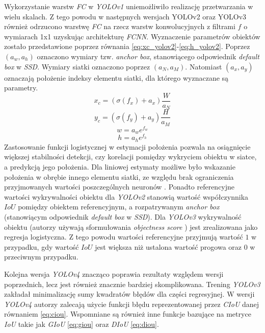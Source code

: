 Wykorzystanie warstw \emph{FC} w  \emph{YOLOv1} uniemożliwiło realizację przetwarzania w wielu skalach.
Z tego powodu w następnych wersjach YOLOv2 \cite{yolov2} oraz YOLOv3 \cite{yolov3} również odrzucono warstwę \emph{FC} na rzecz warstw konwolucyjnych z filtrami $f$ o wymiarach 1x1 uzyskując architekturę \emph{FCNN}. 
Wyznaczenie parametrów obiektów zostało przedstawione poprzez równania \eqref{eq:xc_yolov2}-\eqref{eq:h_yolov2}. Poprzez $(a_w,a_h)$ oznaczono wymiary tzw. \emph{anchor box}, stanowiącego odpowiednik \emph{default box} w \emph{SSD}. 
Wymiary siatki oznaczono poprzez $(a_N,a_M)$. Natomiast $(a_x,a_y)$ oznaczają położenie indeksy elementu siatki, dla którego wyznaczane są parametry. 
\begin{equation}
x_c = (\sigma(f_x) + a_x) \frac{W}{a_N}
\label{eq:xc_yolov2}
\end{equation}
\begin{equation}
y_c = (\sigma(f_y) + a_y) \frac{H}{a_M}
\label{eq:yc_yolov2}
\end{equation}
\begin{equation}
w = a_w e^{f_w}
\label{eq:w_yolov2}
\end{equation}
\begin{equation}
h = a_h e^{f_h}
\label{eq:h_yolov2}
\end{equation}
Zastosowanie funkcji logistycznej w estymacji położenia pozwala na osiągnięcie większej stabilności detekcji, czy korelacji pomiędzy wykryciem obiektu w siatce, a predykcją jego położenia.
Dla liniowej estymaty możliwe było wskazanie położenia w obrębie innego elementu siatki, ze względu brak ograniczenia przyjmowanych wartości poszczególnych neuronów \cite{yolov2}. 
Ponadto referencyjne wartości wykrywalności obiektu dla \emph{YOLOv2} stanowią wartość współczynnika $IoU$ pomiędzy obiektem referencyjnym, a rozpatrywanym \emph{anchor box} (stanowiącym odpowiednik \emph{default box} w \emph{SSD}). 
Dla \emph{YOLOv3} wykrywalność obiektu (autorzy używają sformułowania \emph{objectness score} \cite{yolov3}) jest zrealizowana jako regresja logistyczna. 
Z tego powodu wartości referencyjne przyjmują wartość $1$ w przypadku, gdy wartość $IoU$ jest większa niż ustalona wartość progowa oraz $0$ w przeciwnym przypadku. 

Kolejna wersja \emph{YOLOv4}\cite{yolov4} znacząco poprawia rezultaty względem wersji poprzednich, lecz jest również znacznie bardziej skomplikowana. Trening \emph{YOLOv3} zakładał minimalizację sumy kwadratów błędów dla części regresyjnej. W wersji \emph{YOLOv4} autorzy\cite{yolov4} zalecają użycie funkcji błędu reprezentowanej przez \emph{CIoU} \cite{dciou} danej równaniem \eqref{eq:ciou}.
Wspomniane są również inne funkcje bazujące na metryce \emph{IoU} takie jak \emph{GIoU}\cite{giou} \eqref{eq:giou} oraz \emph{DIoU} \cite{dciou} \eqref{eq:diou}.

